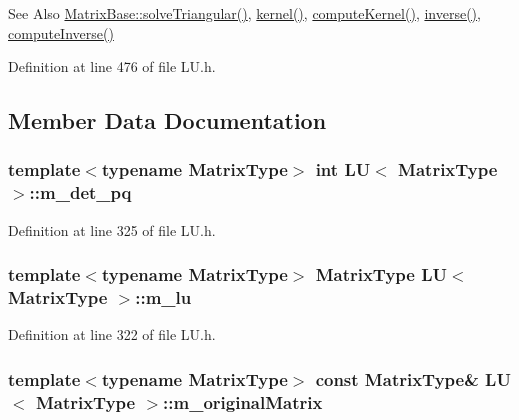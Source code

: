 \begin{DoxySeeAlso}{See Also}
\hyperlink{class_matrix_base_aa338f29b37898b2104b39c32b6854a65}{Matrix\-Base\-::solve\-Triangular()}, \hyperlink{class_l_u_af6f47fa3872cd3e7931ef553e862202d}{kernel()}, \hyperlink{class_l_u_ae15a7528f85589b1494cdf4d12312b59}{compute\-Kernel()}, \hyperlink{class_l_u_aa6216497ac4d2d2ed495432793bb2ae7}{inverse()}, \hyperlink{class_l_u_a3db080336b22760ca951e8732fd67d16}{compute\-Inverse()} 
\end{DoxySeeAlso}


Definition at line 476 of file L\-U.\-h.



\subsection{Member Data Documentation}
\hypertarget{class_l_u_a660047068751fe2899eab257abf2689d}{
\subsubsection[{m\-\_\-det\-\_\-pq}]{\setlength{\rightskip}{0pt plus 5cm}template$<$typename Matrix\-Type$>$ {\bf int} {\bf L\-U}$<$ Matrix\-Type $>$\-::m\-\_\-det\-\_\-pq\hspace{0.3cm}{\ttfamily [protected]}}}\label{class_l_u_a660047068751fe2899eab257abf2689d}


Definition at line 325 of file L\-U.\-h.

\hypertarget{class_l_u_a6002bcdbe1c561d3e9e6ae3289db72cb}{
\subsubsection[{m\-\_\-lu}]{\setlength{\rightskip}{0pt plus 5cm}template$<$typename Matrix\-Type$>$ Matrix\-Type {\bf L\-U}$<$ Matrix\-Type $>$\-::m\-\_\-lu\hspace{0.3cm}{\ttfamily [protected]}}}\label{class_l_u_a6002bcdbe1c561d3e9e6ae3289db72cb}


Definition at line 322 of file L\-U.\-h.

\hypertarget{class_l_u_ac0ddae608326613044fd370e23fc5798}{
\subsubsection[{m\-\_\-original\-Matrix}]{\setlength{\rightskip}{0pt plus 5cm}template$<$typename Matrix\-Type$>$ const Matrix\-Type\& {\bf L\-U}$<$ Matrix\-Type $>$\-::m\-\_\-original\-Matrix\hspace{0.3cm}{\ttfamily [protected]}}}\label{class_l_u_ac0ddae608326613044fd370e23fc5798}


